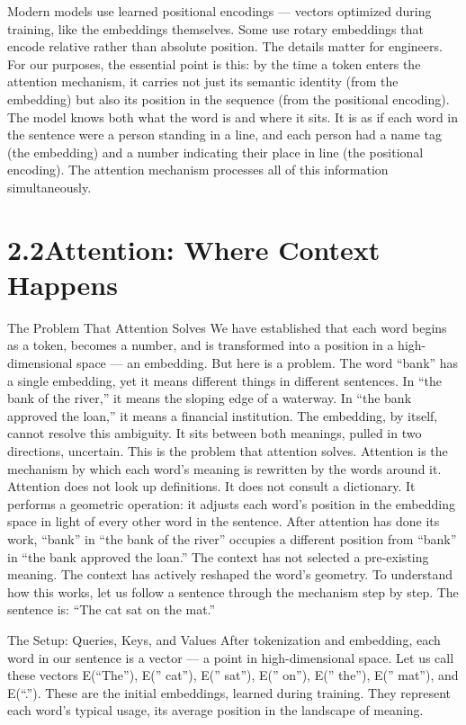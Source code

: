 Modern models use learned positional encodings — vectors optimized during training, like the embeddings themselves. Some use rotary embeddings that encode relative rather than absolute position. The details matter for engineers. For our purposes, the essential point is this: by the time a token enters the attention mechanism, it carries not just its semantic identity (from the embedding) but also its position in the sequence (from the positional encoding). The model knows both what the word is and where it sits. It is as if each word in the sentence were a person standing in a line, and each person had a name tag (the embedding) and a number indicating their place in line (the positional encoding). The attention mechanism processes all of this information simultaneously.

\section{2.2\quad Attention: Where Context Happens}

The Problem That Attention Solves We have established that each word begins as a token, becomes a number, and is transformed into a position in a high-dimensional space — an embedding. But here is a problem. The word “bank” has a single embedding, yet it means different things in different sentences. In “the bank of the river,” it means the sloping edge of a waterway. In “the bank approved the loan,” it means a financial institution. The embedding, by itself, cannot resolve this ambiguity. It sits between both meanings, pulled in two directions, uncertain. This is the problem that attention solves. Attention is the mechanism by which each word’s meaning is rewritten by the words around it. Attention does not look up definitions. It does not consult a dictionary. It performs a geometric operation: it adjusts each word’s position in the embedding space in light of every other word in the sentence. After attention has done its work, “bank” in “the bank of the river” occupies a different position from “bank” in “the bank approved the loan.” The context has not selected a pre-existing meaning. The context has actively reshaped the word’s geometry. To understand how this works, let us follow a sentence through the mechanism step by step. The sentence is: “The cat sat on the mat.”

The Setup: Queries, Keys, and Values After tokenization and embedding, each word in our sentence is a vector — a point in high-dimensional space. Let us call these vectors E(“The”), E(” cat”), E(” sat”), E(” on”), E(” the”), E(” mat”), and E(“.”). These are the initial embeddings, learned during training. They represent each word’s typical usage, its average position in the landscape of meaning.

